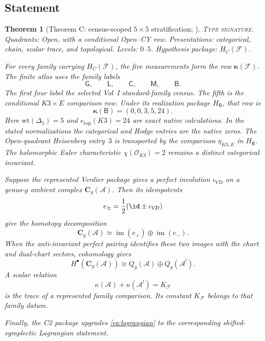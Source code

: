 \documentclass[11pt]{article}
\theoremstyle{plain}
\newtheorem{theorem}{Theorem}[section]
\theoremstyle{definition}
\theoremstyle{remark}
\newcommand{\cA}{\mathcal{A}}
\begin{document}
\subsection{Statement}

\begin{theorem}[Theorem C: census-scoped \(5\times5\) stratification;
\ClaimStatusConditional]
\label{thm:complementarity}
\textsc{Type signature.} Quadrants: Open, with a conditional
Open--CY row. Presentations: categorical, chain, scalar trace, and
topological. Levels: \(0\)--\(5\). Hypothesis package:
\(H_C(\mathcal F)\).

For every family carrying \(H_C(\mathcal F)\), the five measurements
form the row \(\boldsymbol\kappa(\mathcal F)\).  The finite atlas uses
the family labels
\[
 \mathsf G,\qquad\mathsf L,\qquad\mathsf C,\qquad
 \mathsf M,\qquad\mathsf B.
\]
The first four label the selected Vol~I standard-family census.  The
fifth is the conditional \(K3\times E\) comparison row.  Under its
realization package \(H_{\mathsf B}\), that row is
\[
 \boldsymbol\kappa(\mathsf B)=(0,0,3,5,24).
\]
Here \(\mathrm{wt}(\Delta_5)=5\) \cite{Gritsenko1999} and
\(e_{\mathrm{top}}(K3)=24\) \cite{Mukai1987} are exact native
calculations.  In the stated normalizations the categorical and Hodge
entries are the native zeros.  The Open-quadrant Heisenberg entry~$3$
is transported by the comparison
\(\eta_{K3,E}\) in \(H_{\mathsf B}\).  The holomorphic Euler
characteristic \(\chi(\mathcal O_{K3})=2\) remains a distinct
categorical invariant.

Suppose the represented Verdier package gives a perfect involution
\(\iota_{\mathrm{VD}}\) on a genus-\(g\) ambient complex
\(\mathbf C_g(\cA)\).  Then its idempotents
\[
 e_\pm=\frac12(\id\pm\iota_{\mathrm{VD}})
\]
give the homotopy decomposition
\begin{equation}\label{eq:lagrangian}
 \mathbf C_g(\cA)\simeq
 \operatorname{im}(e_+)\oplus\operatorname{im}(e_-).
\end{equation}
When the anti-invariant perfect pairing identifies these two images
with the chart and dual-chart sectors, cohomology gives
\begin{equation}\label{eq:complementarity-cohom}
 H^\bullet(\mathbf C_g(\cA))
 \cong Q_g(\cA)\oplus Q_g(\cA^!).
\end{equation}
A scalar relation
\begin{equation}\label{eq:standalone-scalar-comparison}
 \kappa(\cA)+\kappa(\cA^!)=K_{\mathcal F}
\end{equation}
is the trace of a represented family comparison.  Its constant
\(K_{\mathcal F}\) belongs to that family datum.

Finally, the C2 package upgrades
\eqref{eq:lagrangian} to the corresponding shifted-symplectic
Lagrangian statement.
\end{theorem}
\end{document}
